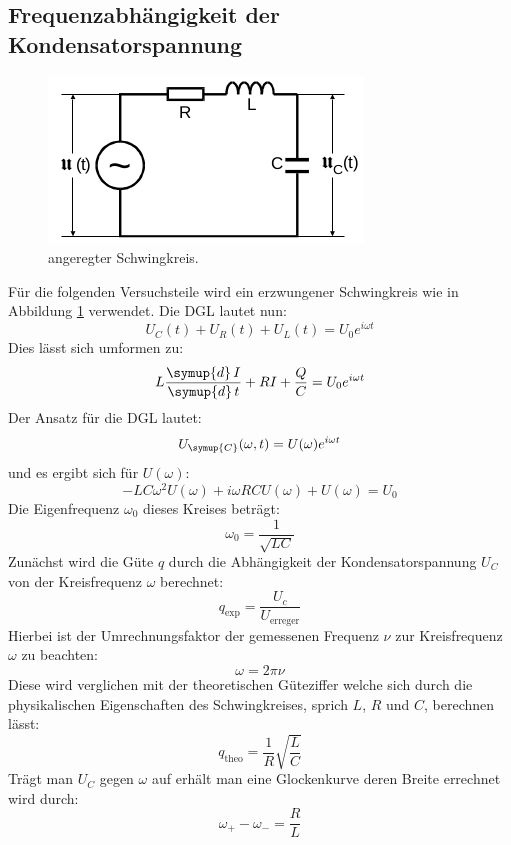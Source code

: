 \subsection{Frequenzabhängigkeit der Kondensatorspannung}
\begin{figure}[H]
  \centering
  \includegraphics{content/images/kreis2.png}
  \caption{angeregter Schwingkreis\cite{anleitung}.}
  \label{fig:kreis2}
\end{figure}
Für die folgenden Versuchsteile wird ein erzwungener Schwingkreis
wie in Abbildung \ref{fig:kreis2} verwendet. Die DGL lautet nun:
\begin{equation}
  U_C(t)+U_R(t)+U_L(t)=U_0e^{i\omega t}
\end{equation}
Dies lässt sich umformen zu:
\begin{equation}
  L\frac{\symup{d}\, I}{\symup{d}\, t} +RI +\frac{Q}{C}=U_0e^{i\omega t}
  \label{eqn:kreis3}
\end{equation}
Der Ansatz für die DGL lautet:
\begin{equation}
  U_\symup{C}(\omega , t)= U(\omega)e^{i\omega t}
\end{equation}
und es ergibt sich für $U(\omega)$:
\begin{equation}
  -LC\omega^2U(\omega)+i\omega RCU(\omega)+U(\omega)=U_0
  \label{eqn:lsg}
\end{equation}
Die Eigenfrequenz $\omega_0$ dieses Kreises beträgt:
\begin{equation}
  \omega_0=\frac{1}{\sqrt{LC}}
  \label{eqn:eigen}
\end{equation}
Zunächst wird die Güte $q$ durch die Abhängigkeit
der Kondensatorspannung $U_C$ von der Kreisfrequenz $\omega$ berechnet:
\begin{equation}
  q_\text{exp}=\frac{U_c}{U_\text{erreger}}
  \label{eqn:qexp}
\end{equation}
Hierbei ist der Umrechnungsfaktor der gemessenen Frequenz $\nu$ zur Kreisfrequenz $\omega$
zu beachten:
\begin{equation}
  \omega = 2\pi\nu
  \label{c1}
\end{equation}
Diese wird verglichen mit der theoretischen Güteziffer welche sich durch die physikalischen
Eigenschaften des Schwingkreises, sprich $L$, $R$ und $C$, berechnen lässt:
\begin{equation}
  q_\text{theo}=\frac{1}{R}\sqrt{\frac{L}{C}}
    \label{eqn:qtheo}
\end{equation}
Trägt man $U_C$ gegen $\omega$ auf erhält man eine Glockenkurve deren Breite errechnet wird durch:
\begin{equation}
  \omega_+-\omega_-=\frac{R}{L}
  \label{eqn:breite}
\end{equation}

